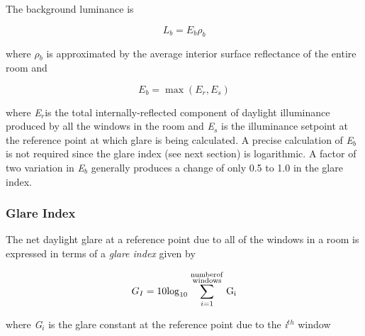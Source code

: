 The background luminance is

\begin{equation}
{L_b} = {E_b}{\rho_b}
\end{equation}

where \emph{$\rho$\(_{b}\)} is approximated by the average interior surface reflectance of the entire room and

\begin{equation}
{E_b} = \max ({E_r},{E_s})
\end{equation}

where \emph{E\(_{r}\)}is the total internally-reflected component of daylight illuminance produced by all the windows in the room and \emph{E\(_{s}\)} is the illuminance setpoint at the reference point at which glare is being calculated. A precise calculation of \emph{E\(_{b}\)} is not required since the glare index (see next section) is logarithmic. A factor of two variation in \emph{E\(_{b}\)} generally produces a change of only 0.5 to 1.0 in the glare index.

\subsubsection{Glare Index}\label{glare-index}

The net daylight glare at a reference point due to all of the windows in a room is expressed in terms of a \emph{glare index} given by

\begin{equation}
{G_I} = 10{\log_{10}}\sum\limits_{i = 1}^{\scriptstyle{\rm{number of}}\atop\scriptstyle{\rm{windows}}} {{{\rm{G}}_{\rm{i}}}}
\end{equation}

where \emph{G\(_{i}\)} is the glare constant at the reference point due to the \emph{i\(^{th}\)} window
